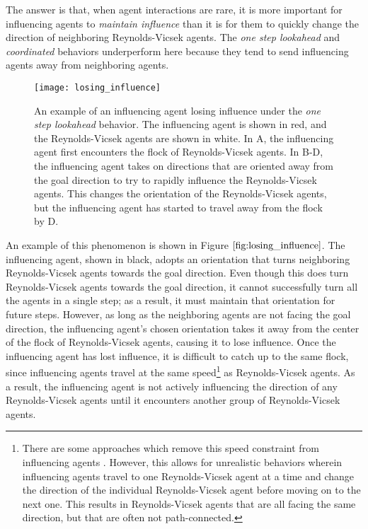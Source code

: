 The answer is that, when agent interactions are rare, it is more important for
influencing agents to \textit{maintain influence} than it is for them to quickly
change the direction of neighboring Reynolds-Vicsek agents.
The \textit{one step lookahead} and \textit{coordinated} behaviors underperform
here because they tend to send influencing agents away from neighboring agents.
\begin{figure}
    \texttt{[image: losing\_influence]}
    \caption{An example of an influencing agent losing influence under the
    \textit{one step lookahead} behavior.
    The influencing agent is shown in red, and the Reynolds-Vicsek agents are
    shown in white.
    In A, the influencing agent first encounters the flock of Reynolds-Vicsek
    agents.
    In B-D, the influencing agent takes on directions that are oriented away
    from the goal direction to try to rapidly influence the Reynolds-Vicsek
    agents.
    This changes the orientation of the Reynolds-Vicsek agents, but the
    influencing agent has started to travel away from the flock by D.}
    \label{fig:losing_influence}
\end{figure}
An example of this phenomenon is shown in Figure $\ref{fig:losing_influence}$.
The influencing agent, shown in black, adopts an orientation that turns
neighboring Reynolds-Vicsek agents towards the goal direction.
Even though this does turn Reynolds-Vicsek agents towards the goal direction,
it cannot successfully turn all the agents in a single step; as a result, it
must maintain that orientation for future steps.
However, as long as the neighboring agents are not facing the goal direction,
the influencing agent's chosen orientation takes it away from the center of the
flock of Reynolds-Vicsek agents, causing it to lose influence.
Once the influencing agent has lost influence, it is difficult to catch up to
the same flock, since influencing agents travel at the same speed\footnote{
There are some approaches which remove this speed constraint from
influencing agents \cite{han2010teleporting}.
However, this allows for unrealistic behaviors wherein influencing agents travel
to one Reynolds-Vicsek agent at a time and change the direction of the
individual Reynolds-Vicsek agent before moving on to the next one.
This results in Reynolds-Vicsek agents that are all facing the same direction,
but that are often not path-connected.}
as Reynolds-Vicsek agents.
As a result, the influencing agent is not actively influencing the direction of
any Reynolds-Vicsek agents until it encounters another group of Reynolds-Vicsek
agents.

